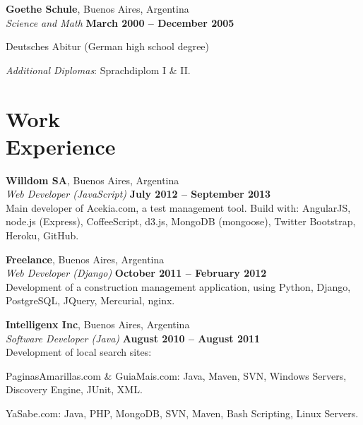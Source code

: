 \documentclass[margin,line]{resume}
\begin{document}
\begin{resume}
    \textbf{Goethe Schule}, Buenos Aires, Argentina \vspace{2mm}\\\vspace{1mm}%
    \textsl{Science and Math} \hfill \textbf{ March 2000 -- December 2005}\vspace{-3mm}\\\vspace{-1mm}%
    \begin{list2}
        \item Deutsches Abitur (German high school degree)
        \item \textit{Additional Diplomas}: Sprachdiplom I \& II.
    \end{list2}\vspace{-1.5mm}

    \section{\mysidestyle Work\\Experience}

    \textbf{Willdom SA}, Buenos Aires, Argentina \vspace{2mm}\\\vspace{1mm}%
    \textsl{Web Developer (JavaScript)} \hfill \textbf{July 2012 -- September 2013}\vspace{1.5mm}\\\vspace{0mm}%
    Main developer of Acekia.com, a test management tool. Build with: AngularJS, node.js (Express), CoffeeScript, d3.js, MongoDB (mongoose), Twitter Bootstrap, Heroku, GitHub.  

    \textbf{Freelance}, Buenos Aires, Argentina \vspace{2mm}\\\vspace{1mm}%
    \textsl{Web Developer (Django)} \hfill \textbf{October 2011 -- February 2012}\vspace{1.5mm}\\\vspace{0mm}%
	Development of a construction management application, using Python, Django, PostgreSQL, JQuery, Mercurial, nginx.

    \textbf{Intelligenx Inc}, Buenos Aires, Argentina \vspace{2mm}\\\vspace{1mm}%
    \textsl{Software Developer (Java)} \hfill \textbf{August 2010 -- August 2011}\\
    Development of local search sites:
    \begin{list2}
        \item PaginasAmarillas.com \& GuiaMais.com: Java, Maven, SVN, Windows Servers, Discovery Engine, JUnit, XML.
        \item YaSabe.com: Java, PHP, MongoDB, SVN, Maven, Bash Scripting, Linux Servers. 
    \end{list2}\vspace{-1.5mm}	


\end{resume}
\end{document}
